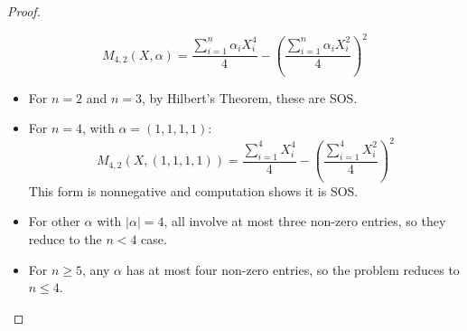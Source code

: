 \documentclass{article}
\begin{document}
\begin{proof}
\begin{enumerate}
      \[
         M_{4,2}(X, \alpha) = \frac{\sum_{i=1}^n \alpha_i X_i^4}{4} - \left( \frac{\sum_{i=1}^n \alpha_i X_i^2}{4} \right)^2
      \]
      \begin{itemize}
         \item For $n=2$ and $n=3$, by Hilbert's Theorem, these are SOS.
         \item For $n=4$, with $\alpha = (1,1,1,1)$:
         \[
            M_{4,2}(X, (1,1,1,1)) = \frac{\sum_{i=1}^4 X_i^4}{4} - \left( \frac{\sum_{i=1}^4 X_i^2}{4} \right)^2
         \]
         This form is nonnegative and computation shows it is SOS.
         \item For other $\alpha$ with $|\alpha|=4$, all involve at most three non-zero entries, so they reduce to the 
         $n<4$ case.
         \item For $n \geq 5$, any $\alpha$ has at most four non-zero entries, so the problem reduces to $n \leq 4$.
      \end{itemize}
\end{enumerate}


\end{proof}
\end{document}
